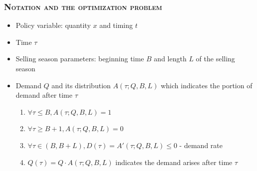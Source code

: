 \documentclass[aspectratio=169]{../presentation}
\begin{document}
    \begin{frame}
        \frametitle{\textsc{Notation and the optimization problem}}

        \begin{itemize}
            \item Policy variable: quantity $x$ and timing $t$
            \item Time $\tau$
            \item Selling season parameters: beginning time $B$ and length $L$ of the selling season
            \item Demand $Q$ and its distribution $A(\tau; Q, B, L)$ which indicates the portion of demand after time $\tau$
            \pause
            \begin{enumerate}
                \item $\forall \tau \leq B, A(\tau; Q, B, L) = 1$
                \item $\forall \tau \geq B + 1, A(\tau; Q, B, L) = 0$
                \item $\forall \tau \in (B, B+L), D(\tau) = A'(\tau; Q, B, L) \leq 0$ - demand rate
                \item $Q(\tau) = Q\cdot A(\tau; Q, B, L)$ indicates the demand arises after time $\tau$
            \end{enumerate}
        \end{itemize}

    \end{frame}
\end{document}
